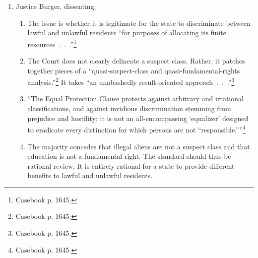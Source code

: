 \begin{enumerate}
\begin{enumerate}
        to achieve by promoting the creation and perpetuation of a subclass of 
        illiterates within out boundaries, surely adding to the problems and 
        costs of unemployment, welfare, crime.''\footnote{Casebook p. 1644.}
        \item The law did not further a substantial state interest.
    \end{enumerate}
    \item Justice Burger, dissenting:
    \begin{enumerate}
        \item The issue is whether it is legitimate for the state to 
        discriminate between lawful and unlawful residents ``for purposes of 
        allocating its finite resources~.~.~.''\footnote{Casebook p. 1645.}
        \item The Court does not clearly delineate a suspect class. Rather, it 
        patches together pieces of a ``quasi-suspect-class and 
        quasi-fundamental-rights analysis.''\footnote{Casebook p. 1645.} It 
        takes ``an unabashedly result-oriented 
        approach~.~.~.''\footnote{Casebook p. 1645.}
        \item ``The Equal Protection Clause protects against arbitrary and 
        irrational classifications, and against invidious discrimination 
        stemming from prejudice and hostility; it is not an all-encompassing 
        `equalizer' designed to eradicate every distinction for which persons 
        are not \enquote{responsible.}''\footnote{Casebook p. 1645.}
        \item The majority concedes that illegal aliens are not a suspect 
        class and that education is not a fundamental right. The standard 
        should thus be rational review. It is entirely rational for a state to 
        provide different benefits to lawful and unlawful residents.
    \end{enumerate}
\end{enumerate}

% 
